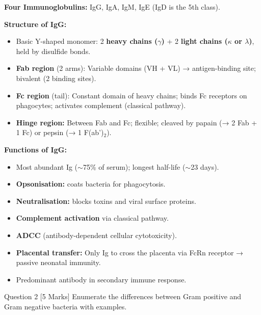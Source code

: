 \documentclass[11pt,a4paper]{article}
\begin{document}
\begin{ansbox}
\textbf{Four Immunoglobulins:} IgG, IgA, IgM, IgE (IgD is the 5th class).

\textbf{Structure of IgG:}
\begin{itemize}[leftmargin=*]
    \item Basic Y-shaped monomer: 2 \textbf{heavy chains ($\gamma$)} + 2 \textbf{light chains ($\kappa$ or $\lambda$)}, held by disulfide bonds.
    \item \textbf{Fab region} (2 arms): Variable domains (VH + VL) → antigen-binding site; bivalent (2 binding sites).
    \item \textbf{Fc region} (tail): Constant domain of heavy chains; binds Fc receptors on phagocytes; activates complement (classical pathway).
    \item \textbf{Hinge region:} Between Fab and Fc; flexible; cleaved by papain (→ 2 Fab + 1 Fc) or pepsin (→ 1 F(ab')$_2$).
\end{itemize}

\textbf{Functions of IgG:}
\begin{itemize}[leftmargin=*]
    \item Most abundant Ig ($\sim$75\% of serum); longest half-life ($\sim$23 days).
    \item \textbf{Opsonisation:} coats bacteria for phagocytosis.
    \item \textbf{Neutralisation:} blocks toxins and viral surface proteins.
    \item \textbf{Complement activation} via classical pathway.
    \item \textbf{ADCC} (antibody-dependent cellular cytotoxicity).
    \item \textbf{Placental transfer:} Only Ig to cross the placenta via FcRn receptor → passive neonatal immunity.
    \item Predominant antibody in secondary immune response.
\end{itemize}
\end{ansbox}

\begin{qbox}{Question 2 [5 Marks]}
Enumerate the differences between Gram positive and Gram negative bacteria with examples.
\end{qbox}
\end{document}
